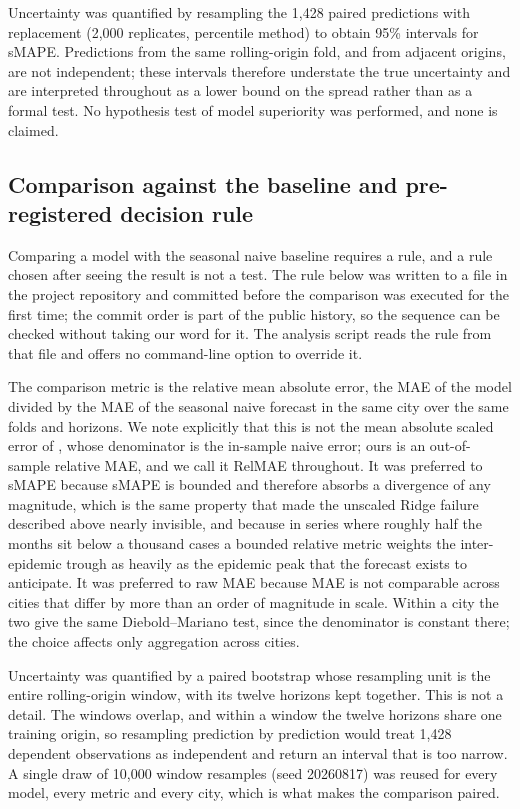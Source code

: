 \documentclass[11pt]{article}
\begin{document}
Uncertainty was quantified by resampling the 1{,}428 paired predictions with replacement
(2{,}000 replicates, percentile method) to obtain 95\% intervals for sMAPE. Predictions
from the same rolling-origin fold, and from adjacent origins, are not independent;
these intervals therefore understate the true uncertainty and are interpreted throughout
as a lower bound on the spread rather than as a formal test. No hypothesis test of
model superiority was performed, and none is claimed.

\subsection{Comparison against the baseline and pre-registered decision rule}
\label{sec:criterion}

Comparing a model with the seasonal naive baseline requires a rule, and a rule chosen
after seeing the result is not a test. The rule below was written to a file in the project
repository and committed before the comparison was executed for the first time; the commit
order is part of the public history, so the sequence can be checked without taking our word
for it. The analysis script reads the rule from that file and offers no command-line option
to override it.

The comparison metric is the relative mean absolute error, the MAE of the model divided by
the MAE of the seasonal naive forecast in the same city over the same folds and horizons.
We note explicitly that this is not the mean absolute scaled error of
\citet{Hyndman2006}, whose denominator is the in-sample naive error; ours is an
out-of-sample relative MAE, and we call it RelMAE throughout. It was preferred to sMAPE
because sMAPE is bounded and therefore absorbs a divergence of any magnitude, which is the
same property that made the unscaled Ridge failure described above nearly invisible, and
because in series where roughly half the months sit below a thousand cases a bounded
relative metric weights the inter-epidemic trough as heavily as the epidemic peak that the
forecast exists to anticipate. It was preferred to raw MAE because MAE is not comparable
across cities that differ by more than an order of magnitude in scale. Within a city the
two give the same Diebold--Mariano test, since the denominator is constant there; the
choice affects only aggregation across cities.

Uncertainty was quantified by a paired bootstrap whose resampling unit is the entire
rolling-origin window, with its twelve horizons kept together. This is not a detail. The
windows overlap, and within a window the twelve horizons share one training origin, so
resampling prediction by prediction would treat 1{,}428 dependent observations as
independent and return an interval that is too narrow. A single draw of 10{,}000 window
resamples (seed 20260817) was reused for every model, every metric and every city, which
is what makes the comparison paired.
\end{document}
